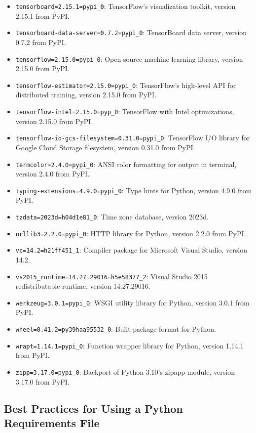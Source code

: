 \begin{itemize}
	\item \texttt{tensorboard=2.15.1=pypi\_0}: TensorFlow's visualization toolkit, version 2.15.1 from PyPI.
	\item \texttt{tensorboard-data-server=0.7.2=pypi\_0}: TensorBoard data server, version 0.7.2 from PyPI.
	\item \texttt{tensorflow=2.15.0=pypi\_0}: Open-source machine learning library, version 2.15.0 from PyPI.
	\item \texttt{tensorflow-estimator=2.15.0=pypi\_0}: TensorFlow's high-level API for distributed training, version 2.15.0 from PyPI.
	\item \texttt{tensorflow-intel=2.15.0=pyp\_0}: TensorFlow with Intel optimizations, version 2.15.0 from PyPI.
	\item \texttt{tensorflow-io-gcs-filesystem=0.31.0=pypi\_0}: TensorFlow I/O library for Google Cloud Storage filesystem, version 0.31.0 from PyPI.
	\item \texttt{termcolor=2.4.0=pypi\_0}: ANSI color formatting for output in terminal, version 2.4.0 from PyPI.
	\item \texttt{typing-extensions=4.9.0=pypi\_0}: Type hints for Python, version 4.9.0 from PyPI.
	\item \texttt{tzdata=2023d=h04d1e81\_0}: Time zone database, version 2023d.
	\item \texttt{urllib3=2.2.0=pypi\_0}: HTTP library for Python, version 2.2.0 from PyPI.
	\item \texttt{vc=14.2=h21ff451\_1}: Compiler package for Microsoft Visual Studio, version 14.2.
	\item \texttt{vs2015\_runtime=14.27.29016=h5e58377\_2}: Visual Studio 2015 redistributable runtime, version 14.27.29016.
	\item \texttt{werkzeug=3.0.1=pypi\_0}: WSGI utility library for Python, version 3.0.1 from PyPI.
	\item \texttt{wheel=0.41.2=py39haa95532\_0}: Built-package format for Python.
	\item \texttt{wrapt=1.14.1=pypi\_0}: Function wrapper library for Python, version 1.14.1 from PyPI.
	\item \texttt{zipp=3.17.0=pypi\_0}: Backport of Python 3.10's zipapp module, version 3.17.0 from PyPI.
\end{itemize}

\subsection{Best Practices for Using a Python Requirements File}

